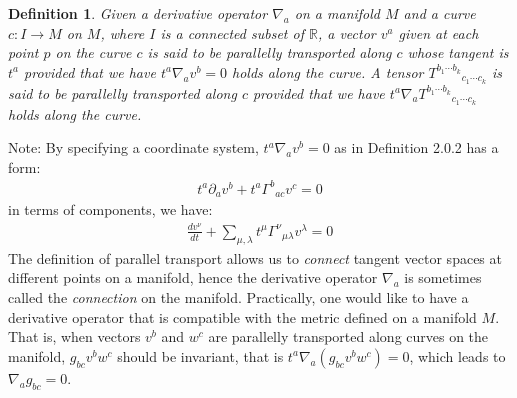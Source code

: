 \documentclass[11pt, onesided]{book}
\theoremstyle{break}
\theoremstyle{break}
\newtheorem{defn}{Definition}[thm]
\newcommand{\R}{\mathbb{R}}
\newcommand{\pd}{\partial}
\newcommand{\note}{\color{red}Note: \color{black}}
\begin{document}
\begin{defn}
Given a derivative operator $\nabla_a$ on a manifold $M$ and a curve $c: I \to M$ on $M$, where $I$ is a connected subset of $\R$, a vector $v^a$ given at each point $p$ on the curve $c$ is said to be parallelly transported along $c$ whose tangent is $t^a$ provided that we have $t^a \nabla_a v^b=0$ holds along the curve. A tensor $T^{b_1 \cdots  b_k}{}_{c_1 \cdots  c_k}$ is said to be parallelly transported along $c$ provided that we have $t^a \nabla_aT^{b_1 \cdots  b_k}{}_{c_1 \cdots  c_k}$ holds along the curve. 
\end{defn}

\note By specifying a coordinate system, $t^a \nabla_a v^b=0$ as in Definition 2.0.2 has a form:
\begin{align*}
t^a \pd_a v^b + t^a \Gamma^b{}_{ac}v^c = 0
\end{align*}
in terms of components, we have:
\begin{align*}
\frac{dv^\nu}{dt} + \sum_{\mu, \lambda} t^\mu \Gamma^{\nu}{}_{\mu\lambda}v^\lambda = 0
\end{align*}
\hfill\break
\hfill\break
The definition of parallel transport allows us to \textit{connect} tangent vector spaces at different points on a manifold, hence the derivative operator $\nabla_a$ is sometimes called the \textit{connection} on the manifold. Practically, one would like to have a derivative operator that is compatible with the metric defined on a manifold $M$. That is, when vectors $v^b$ and $w^c$ are parallelly transported along curves on the manifold, $g_{bc}v^bw^c$ should be invariant, that is $t^a\nabla_a (g_{bc}v^bw^c) = 0$, which leads to $\nabla_a g_{bc} = 0$. 
\end{document}
